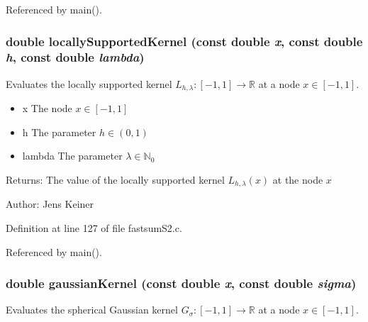 Referenced by main().\hypertarget{group__applications__fastsumS2__test_ga3}{
\subsubsection[locallySupportedKernel]{\setlength{\rightskip}{0pt plus 5cm}double locally\-Supported\-Kernel (const double {\em x}, const double {\em h}, const double {\em lambda})}}
\label{group__applications__fastsumS2__test_ga3}


Evaluates the locally supported kernel $L_{h,\lambda}: [-1,1] \rightarrow \mathbb{R}$ at a node $x \in [-1,1]$. 

\begin{itemize}
\item x The node $x \in [-1,1]$ \item h The parameter $h \in (0,1)$ \item lambda The parameter $\lambda \in \mathbb{N}_0$\end{itemize}
\begin{Desc}
\item[Returns:]The value of the locally supported kernel $L_{h,\lambda}(x)$ at the node $x$\end{Desc}
\begin{Desc}
\item[Author:]Jens Keiner \end{Desc}


Definition at line 127 of file fastsum\-S2.c.

Referenced by main().\hypertarget{group__applications__fastsumS2__test_ga4}{
\subsubsection[gaussianKernel]{\setlength{\rightskip}{0pt plus 5cm}double gaussian\-Kernel (const double {\em x}, const double {\em sigma})}}
\label{group__applications__fastsumS2__test_ga4}


Evaluates the spherical Gaussian kernel $G_\sigma: [-1,1] \rightarrow \mathbb{R}$ at a node $x \in [-1,1]$. 

